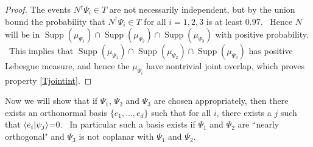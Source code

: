\documentclass[letterpaper,11pt]{article}
\newcommand{\braket}[2]{\mbox{$ \langle #1 | #2 \rangle $}}
\DeclareMathOperator{\supp}{Supp}
\begin{document}
\begin{proof}
The events $N^\dagger \Psi_i \in T$ are not necessarily independent, but by the union bound the probability that $N^\dagger \Psi_i \in T$ for all $i=1,2,3$ is at least $0.97$. \ Hence $N$ will be in $\supp(\mu_{\Psi_1}) \cap \supp(\mu_{\Psi_2}) \cap \supp(\mu_{\Psi_3})$ with positive probability. \ This implies that $ \supp(\mu_{\Psi_1}) \cap \supp(\mu_{\Psi_2}) \cap \supp(\mu_{\Psi_3})$ has positive Lebesgue measure, and hence the $\mu_{\Psi_i}$ have nontrivial joint overlap, which proves property \ref{Tjointint}.

\end{proof}


Now we will show that if $\Psi_1$, $\Psi_2$ and $\Psi_3$ are chosen appropriately, then there exists an orthonormal basis $\{e_1,\ldots,e_d\}$ such that for all $i$, there exists a $j$ such that $\braket{e_i}{\psi_j}$=0. \ In particular such a basis exists if $\Psi_1$ and $\Psi_2$ are ``nearly orthogonal" and $\Psi_3$ is not coplanar with $\Psi_1$ and $\Psi_2$.
\end{document}
